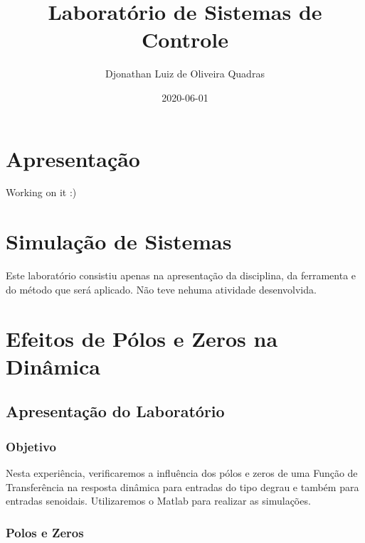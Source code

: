 \documentclass[
]{book}
\title{Laboratório de Sistemas de Controle}
\author{Djonathan Luiz de Oliveira Quadras}
\date{2020-06-01}
\begin{document}
\maketitle

{
\setcounter{tocdepth}{1}
\tableofcontents
}
\hypertarget{apresentauxe7uxe3o}{%
\chapter*{Apresentação}\label{apresentauxe7uxe3o}}

Working on it :)

\hypertarget{simulauxe7uxe3o-de-sistemas}{%
\chapter{Simulação de Sistemas}\label{simulauxe7uxe3o-de-sistemas}}

Este laboratório consistiu apenas na apresentação da disciplina, da ferramenta e do método que será aplicado. Não teve nehuma atividade desenvolvida.

\hypertarget{efeitos-de-puxf3los-e-zeros-na-dinuxe2mica}{%
\chapter{Efeitos de Pólos e Zeros na Dinâmica}\label{efeitos-de-puxf3los-e-zeros-na-dinuxe2mica}}

\hypertarget{apresentauxe7uxe3o-do-laboratuxf3rio}{%
\section{Apresentação do Laboratório}\label{apresentauxe7uxe3o-do-laboratuxf3rio}}

\hypertarget{objetivo}{%
\subsection{Objetivo}\label{objetivo}}

Nesta experiência, verificaremos a influência dos pólos e zeros de uma Função de Transferência na resposta dinâmica para entradas do tipo degrau e também para entradas senoidais. Utilizaremos o Matlab para realizar as
simulações.

\hypertarget{polos-e-zeros}{%
\subsection{Polos e Zeros}\label{polos-e-zeros}}
\end{document}
